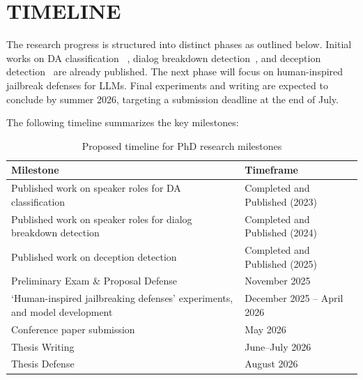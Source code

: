 \pagestyle{plain} %





\chapter{\uppercase{Timeline}}

The research progress is structured into distinct phases as outlined below. Initial works on DA classification ~\cite{miah-etal-2023-hierarchical}, dialog breakdown detection~\cite{MiahDB}, and deception detection~\cite{MiahDC} are already published. The next phase will focus on human-inspired jailbreak defenses for LLMs. Final experiments and writing are expected to conclude by summer 2026, targeting a submission deadline at the end of July.

The following timeline summarizes the key milestones:

\begin{table}[h!]
\centering
\begin{tabular}{|p{8cm}|p{7cm}|}
\hline
\textbf{Milestone} & \textbf{Timeframe} \\
\hline
Published work on speaker roles for DA classification & Completed and Published (2023) \\
\hline
Published work on speaker roles for dialog breakdown detection & Completed and Published (2024) \\
\hline
Published work on deception detection & Completed and Published (2025) \\
\hline
Preliminary Exam \& Proposal Defense & November 2025 \\
\hline
`Human-inspired jailbreaking defenses' experiments, and model development & December 2025 – April 2026 \\
\hline
Conference paper submission & May 2026 \\
\hline
Thesis Writing & June–July 2026 \\
\hline
Thesis Defense & August 2026 \\
\hline
\end{tabular}
\caption{Proposed timeline for PhD research milestones}
\end{table}



